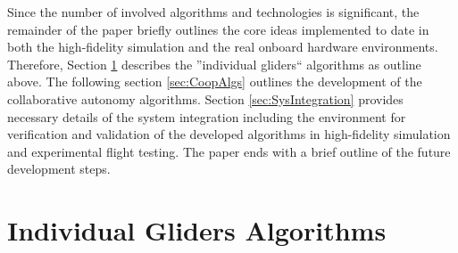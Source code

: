 \documentclass{ifacconf}
\begin{document}
Since the number of involved algorithms and technologies is significant, the remainder of the paper briefly outlines the core ideas implemented to date in both the high-fidelity simulation and the real onboard hardware environments. Therefore, Section \ref{sec:InAlgs} describes the ''individual gliders`` algorithms as outline above. The following section \ref{sec:CoopAlgs}  outlines the development of the collaborative autonomy algorithms. Section \ref{sec:SysIntegration} provides necessary details of the system integration including the environment for verification and validation of the developed algorithms in high-fidelity simulation and experimental flight testing. The paper ends with a brief outline of the future development steps.

%

\section{Individual Gliders Algorithms}
\label{sec:InAlgs}
\end{document}
